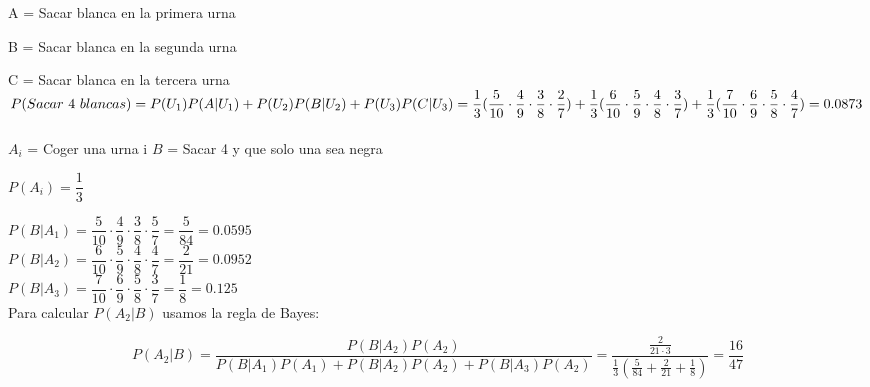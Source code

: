 \problem \\

\subproblem \\

A = Sacar blanca en la primera urna

B = Sacar blanca en la segunda urna

C = Sacar blanca en la tercera urna \\


$P(Sacar\ 4 \ blancas) = P(U_1)P(A|U_1) + P(U_2)P(B|U_2) + P(U_3)P(C|U_3) = \\


\dfrac{1}{3}(\dfrac{5}{10}\cdot\dfrac{4}{9}\cdot\dfrac{3}{8}\cdot\dfrac{2}{7}) + 
  \dfrac{1}{3}(\dfrac{6}{10}\cdot\dfrac{5}{9}\cdot\dfrac{4}{8}\cdot\dfrac{3}{7}) + 
  \dfrac{1}{3}(\dfrac{7}{10}\cdot\dfrac{6}{9}\cdot\dfrac{5}{8}\cdot\dfrac{4}{7}) = 0.0873$ \\

\subproblem \\

$A_i$ = Coger una urna i
$B$ = Sacar 4 y que solo una sea negra

$P(A_i) = \dfrac{1}{3}$

$P(B|A_1) = \dfrac{5}{10} \cdot \dfrac{4}{9} \cdot \dfrac{3}{8} \cdot \dfrac{5}{7} = \dfrac{5}{84} = 0.0595$ \\

$P(B|A_2) = \dfrac{6}{10} \cdot \dfrac{5}{9} \cdot \dfrac{4}{8} \cdot \dfrac{4}{7} = \dfrac{2}{21} = 0.0952$ \\

$P(B|A_3) = \dfrac{7}{10} \cdot \dfrac{6}{9} \cdot \dfrac{5}{8} \cdot \dfrac{3}{7} = \dfrac{1}{8} = 0.125$ \\


Para calcular $P(A_2|B)$ usamos la regla de Bayes:

$$ P(A_2|B) = \dfrac{P(B|A_2)P(A_2)}{P(B|A_1)P(A_1)+P(B|A_2)P(A_2)+P(B|A_3)P(A_2)} = \dfrac{\frac{2}{21 \cdot 3}}{\frac{1}{3}(\frac{5}{84} + \frac{2}{21} + \frac{1}{8})} = \dfrac{16}{47}$$
